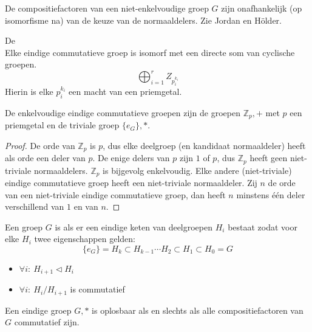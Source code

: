 \documentclass[main.tex]{subfiles}
\begin{document}
\begin{st}
  De compositiefactoren van een niet-enkelvoudige groep $G$ zijn onafhankelijk (op isomorfisme na) van de keuze van de normaaldelers.
  \zb Zie Jordan en H\"older.
\end{st}

\begin{st}
  \label{st:structuurstelling}
  De \\
  Elke eindige commutatieve groep is isomorf met een directe som van cyclische groepen.
  \[ \bigoplus_{i=1}^{r} Z_{p_{i}^{k_{i}}} \]
  Hierin is elke $p_{i}^{k_{i}}$ een macht van een priemgetal.
  \zb
\end{st}

\begin{pr}
  De enkelvoudige eindige commutatieve groepen zijn de groepen $\mathbb{Z}_{p},+$ met $p$ een priemgetal en de triviale groep $\{e_{G}\},*$.
  \begin{proof}
    De orde van $\mathbb{Z}_{p}$ is $p$, dus elke deelgroep (en kandidaat normaaldeler) heeft als orde een deler van $p$.
    De enige delers van $p$ zijn $1$ of $p$, dus $\mathbb{Z}_{p}$ heeft geen niet-triviale normaaldelers.
    $\mathbb{Z}_{p}$ is bijgevolg enkelvoudig.
    Elke andere (niet-triviale) eindige commutatieve groep heeft een niet-triviale normaaldeler.
    Zij $n$ de orde van een niet-triviale eindige commutatieve groep, dan heeft $n$ minstens \'e\'en deler verschillend van $1$ en van $n$.
  \end{proof}
\end{pr}

\begin{de}
  \label{de:oplosbaar}
  Een groep $G$ is  als er een eindige keten van deelgroepen $H_{i}$ bestaat zodat voor elke $H_{i}$ twee eigenschappen gelden:
  \[ \{e_{G}\} = H_{k} \subset H_{k-1} \dotsb H_{2} \subset H_{1} \subset H_{0} = G \]
  \begin{itemize}
  \item $\forall i:\ H_{i+1} \triangleleft H_{i}$
  \item $\forall i:\ H_{i}/H_{i+1}$ is commutatief
  \end{itemize}
\end{de}

\begin{st}
  Een eindige groep $G,*$ is oplosbaar als en slechts als alle compositiefactoren van $G$ commutatief zijn.
  \zb
\end{st}
\end{document}
